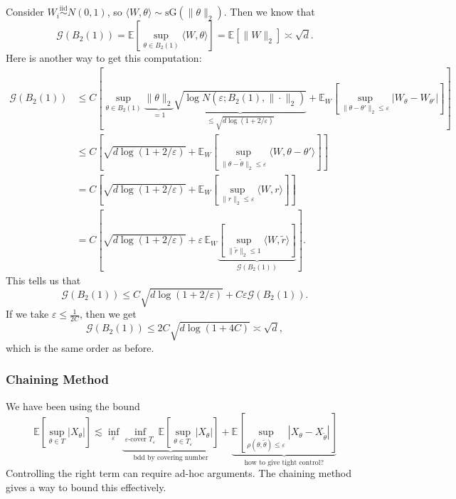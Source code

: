 \begin{exam}
Consider $W_i \overset{\text{iid}}{\sim} N(0, 1)$, so $\langle W, \theta \rangle \sim \mathrm{sG}(\|\theta\|_2)$. Then we know that
\[
\mathcal{G}(B_2(1)) = \mathbb{E}\left[ \sup_{\theta \in B_2(1)} \langle W, \theta \rangle \right] = \mathbb{E}[\|W\|_2] \asymp \sqrt{d}.
\]
Here is another way to get this computation:
\begin{align*}
\mathcal{G}(B_2(1)) &\leq C \left[ \sup_{\theta \in B_2(1)} \underbrace{\|\theta\|_2}_{=1} \underbrace{\sqrt{\log N(\varepsilon; B_2(1), \|\cdot\|_2)}}_{\leq \sqrt{d \log(1 + 2/\varepsilon)}} + \mathbb{E}_W \left[ \sup_{\|\theta - \theta'\|_2 \leq \varepsilon} |W_\theta - W_{\theta'}| \right] \right] \\
&\leq C \left[ \sqrt{d \log(1 + 2/\varepsilon)} + \mathbb{E}_W \left[ \sup_{\|\theta - \widetilde{\theta}\|_2 \leq \varepsilon} \langle W, \theta - \theta' \rangle \right] \right] \\
&= C \left[ \sqrt{d \log(1 + 2/\varepsilon)} + \mathbb{E}_W \left[ \sup_{\|r\|_2 \leq \varepsilon} \langle W, r \rangle \right] \right] \\
&= C \left[ \sqrt{d \log(1 + 2/\varepsilon)} + \varepsilon \, \mathbb{E}_W \underbrace{\left[ \sup_{\|\widetilde{r}\|_2 \leq 1} \langle W, \widetilde{r} \rangle \right]}_{\mathcal{G}(B_2(1))} \right].
\end{align*}
This tells us that
\[
\mathcal{G}(B_2(1)) \leq C \sqrt{d \log(1 + 2/\varepsilon)} + C \varepsilon \mathcal{G}(B_2(1)).
\]
If we take $\varepsilon \leq \frac{1}{2C}$, then we get
\[
\mathcal{G}(B_2(1)) \leq 2C \sqrt{d \log(1 + 4C)} \asymp \sqrt{d},
\]
which is the same order as before.
\end{exam}

\subsubsection{Chaining Method}
We have been using the bound
\[
\mathbb{E}\left[\sup_{\theta \in T} |X_\theta|\right] \lesssim \inf_{\varepsilon} \underbrace{\inf_{\varepsilon\text{-cover } T_\varepsilon} \mathbb{E}\left[\sup_{\theta \in T_\varepsilon} |X_\theta|\right]}_{\text{bdd by covering number}} + \underbrace{\mathbb{E}\left[\sup_{\rho(\theta, \widetilde{\theta}) \leq \varepsilon} |X_\theta - X_{\widetilde{\theta}}|\right]}_{\text{how to give tight control?}}
\]
Controlling the right term can require ad-hoc arguments. The chaining method gives a way to bound this effectively.

